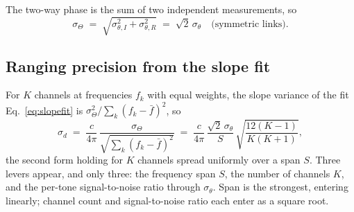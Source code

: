 \documentclass[11pt,a4paper]{article}
\begin{document}
The two-way phase is the sum of two independent measurements, so
\begin{equation}
\sigma_\Theta \;=\; \sqrt{\sigma_{\theta,I}^2 + \sigma_{\theta,R}^2} \;=\; \sqrt2\,\sigma_\theta
\quad\text{(symmetric links)} .
\label{eq:sigmaTheta}
\end{equation}

\subsection{Ranging precision from the slope fit}

For $K$ channels at frequencies $f_k$ with equal weights, the slope variance of the fit
Eq.~\eqref{eq:slopefit} is $\sigma_\Theta^2 / \sum_k (f_k-\bar f)^2$, so
\begin{equation}
\sigma_d \;=\; \frac{c}{4\pi}\,
   \frac{\sigma_\Theta}{\sqrt{\sum_k (f_k-\bar f)^2}}
   \;=\; \frac{c}{4\pi}\,\frac{\sqrt2\,\sigma_\theta}{S}\,
   \sqrt{\frac{12(K-1)}{K(K+1)}} ,
\label{eq:sigmad}
\end{equation}
the second form holding for $K$ channels spread uniformly over a span $S$. Three levers appear, and
only three: the frequency span $S$, the number of channels $K$, and the per-tone signal-to-noise
ratio through $\sigma_\theta$. Span is the strongest, entering linearly; channel count and
signal-to-noise ratio each enter as a square root.
\end{document}
